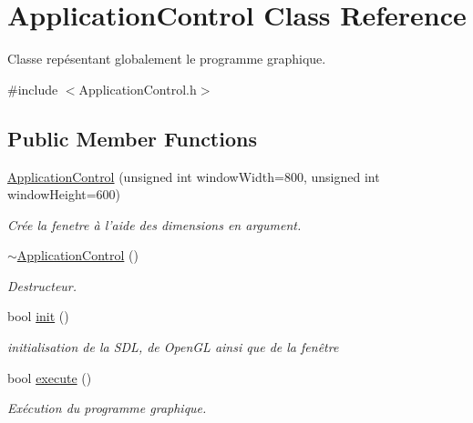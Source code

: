 \hypertarget{classApplicationControl}{\section{Application\-Control Class Reference}
\label{classApplicationControl}
}


Classe repésentant globalement le programme graphique.  




{\ttfamily \#include $<$Application\-Control.\-h$>$}

\subsection*{Public Member Functions}
\begin{DoxyCompactItemize}
\item 
\hypertarget{classApplicationControl_a0297dd9aebc1dec0b82ec9b52ef834ad}{\hyperlink{classApplicationControl_a0297dd9aebc1dec0b82ec9b52ef834ad}{Application\-Control} (unsigned int window\-Width=800, unsigned int window\-Height=600)}\label{classApplicationControl_a0297dd9aebc1dec0b82ec9b52ef834ad}

\begin{DoxyCompactList}\small\item\em Crée la fenetre à l'aide des dimensions en argument. \end{DoxyCompactList}\item 
\hypertarget{classApplicationControl_a77142ab2e6afa9bc4b470a00b41aed77}{\hyperlink{classApplicationControl_a77142ab2e6afa9bc4b470a00b41aed77}{$\sim$\-Application\-Control} ()}\label{classApplicationControl_a77142ab2e6afa9bc4b470a00b41aed77}

\begin{DoxyCompactList}\small\item\em Destructeur. \end{DoxyCompactList}\item 
\hypertarget{classApplicationControl_a11c3f05fcf4c19e4be15ef49cec06a43}{bool \hyperlink{classApplicationControl_a11c3f05fcf4c19e4be15ef49cec06a43}{init} ()}\label{classApplicationControl_a11c3f05fcf4c19e4be15ef49cec06a43}

\begin{DoxyCompactList}\small\item\em initialisation de la S\-D\-L, de Open\-G\-L ainsi que de la fenêtre \end{DoxyCompactList}\item 
\hypertarget{classApplicationControl_ae2fa75e6d29ef2479d47076f1a780113}{bool \hyperlink{classApplicationControl_ae2fa75e6d29ef2479d47076f1a780113}{execute} ()}\label{classApplicationControl_ae2fa75e6d29ef2479d47076f1a780113}

\begin{DoxyCompactList}\small\item\em Exécution du programme graphique. \end{DoxyCompactList}\end{DoxyCompactItemize}


